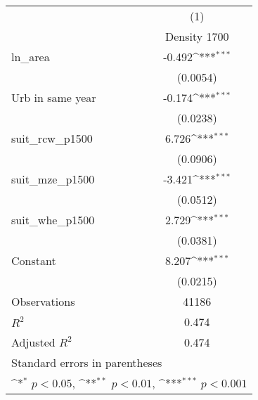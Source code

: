 {
\def\sym#1{\ifmmode^{#1}\else\(^{#1}\)\fi}
\begin{tabular}{l*{1}{c}}
\toprule
                    &\multicolumn{1}{c}{(1)}\\
                    &\multicolumn{1}{c}{Density 1700}\\
\midrule
ln\_area             &      -0.492\sym{***}\\
                    &    (0.0054)         \\
\addlinespace
Urb in same year    &      -0.174\sym{***}\\
                    &    (0.0238)         \\
\addlinespace
suit\_rcw\_p1500      &       6.726\sym{***}\\
                    &    (0.0906)         \\
\addlinespace
suit\_mze\_p1500      &      -3.421\sym{***}\\
                    &    (0.0512)         \\
\addlinespace
suit\_whe\_p1500      &       2.729\sym{***}\\
                    &    (0.0381)         \\
\addlinespace
Constant            &       8.207\sym{***}\\
                    &    (0.0215)         \\
\midrule
Observations        &       41186         \\
\(R^{2}\)           &       0.474         \\
Adjusted \(R^{2}\)  &       0.474         \\
\bottomrule
\multicolumn{2}{l}{\footnotesize Standard errors in parentheses}\\
\multicolumn{2}{l}{\footnotesize \sym{*} \(p<0.05\), \sym{**} \(p<0.01\), \sym{***} \(p<0.001\)}\\
\end{tabular}
}
